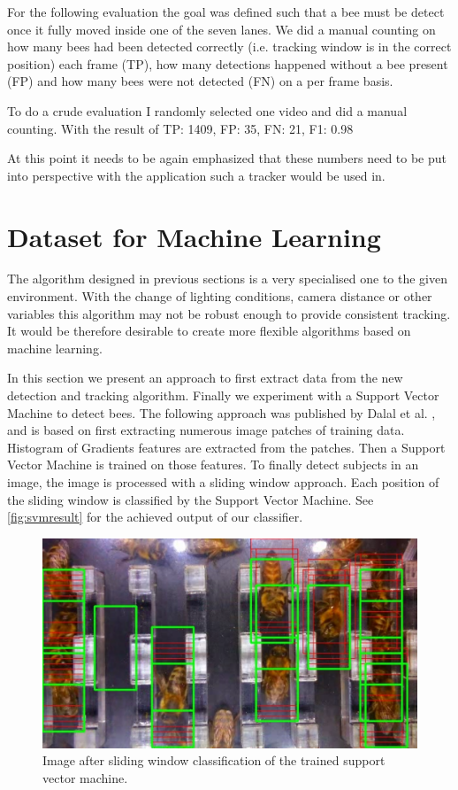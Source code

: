 \documentclass[10pt,a4paper]{article}
\begin{document}
For the following evaluation the goal was defined such that a bee must be detect once it fully moved inside one of the seven lanes. We did a manual counting on how many bees had been detected correctly (i.e. tracking window is in the correct position) each frame (TP), how many detections happened without a bee present (FP) and how many bees were not detected (FN) on a per frame basis. 

To do a crude evaluation I randomly selected one video and did a manual counting. With the result of TP: 1409, FP: 35, FN: 21, F1: 0.98

At this point it needs to be again emphasized that these numbers need to be put into perspective with the application such a tracker would be used in.

\section{Dataset for Machine Learning}
\label{sec:newdataset}
The algorithm designed in previous sections is a very specialised one to the given environment. With the change of lighting conditions, camera distance or other variables this algorithm may not be robust enough to provide consistent tracking. It would be therefore desirable to create more flexible algorithms based on machine learning. 

In this section we present an approach to first extract data from the new detection and tracking algorithm. Finally we experiment with a Support Vector Machine to detect bees. The following approach was published by Dalal et al. \cite{dalal2005histograms}, and is based on first extracting numerous image patches of training data. Histogram of Gradients features are extracted from the patches. Then a Support Vector Machine is trained on those features. To finally detect subjects in an image, the image is processed with a sliding window approach. Each position of the sliding window is classified by the Support Vector Machine. See \ref{fig:svmresult} for the achieved output of our classifier. 

\begin{figure}
\label{fig:preprocessing}
\center
\includegraphics[width=1.0\textwidth]{svmresult}
\caption{Image after sliding window classification of the trained support vector machine.}
\end{figure}
\end{document}
